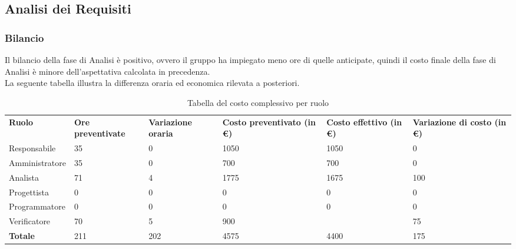 \subsection{Analisi dei Requisiti}
\subsubsection{Bilancio}
Il bilancio della fase di Analisi è positivo, ovvero il gruppo ha impiegato meno ore di quelle anticipate, quindi il costo finale della fase di Analisi è minore dell'aspettativa calcolata in precedenza.\\
La seguente tabella illustra la differenza oraria ed economica rilevata a posteriori.

{
\renewcommand{\arraystretch}{2}
\begin{longtable}[h]{ C{2.5cm} C{2.5cm} C{2.5cm} C{2.5cm} C{1.5cm} C{2.5cm}}
\caption{Tabella del costo complessivo per ruolo}\\
\rowcolor{\primaryColor}

\textcolor{\secondaryColor}{\textbf{Ruolo}} & 
\textcolor{\secondaryColor}{\textbf{Ore preventivate}} & 
\textcolor{\secondaryColor}{\textbf{Variazione oraria}} & 
\textcolor{\secondaryColor}{\textbf{Costo preventivato (in \euro{})}} & 
\textcolor{\secondaryColor}{\textbf{Costo effettivo (in \euro{})}} & 
\textcolor{\secondaryColor}{\textbf{Variazione di costo (in \euro{})}}\\	
	
Responsabile    &  35 & 0 & 1050 & 1050 &  0 \\
Amministratore  &  35 & 0 & 700 & 700 & 0 \\
Analista        & 71 & 4 & 1775 & 1675 & 100 \\
Progettista     &   0 &   0 &    0 &  0 & 0 \\
Programmatore   &   0 &   0 &    0 &  0 & 0 \\
Verificatore    &  70 &  5 & 900 &  & 		75 \\
\textbf{Totale} & 211 & 202 & 4575 & 4400 & 175 \\	

\end{longtable}
}

